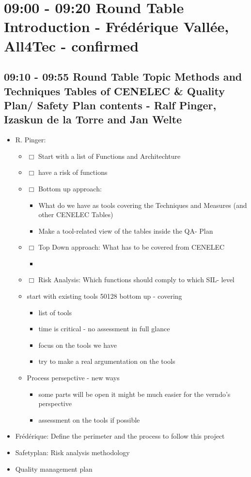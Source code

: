\documentclass[a4paper,german]{article}
\begin{document}
\setcounter{tocdepth}{3}
\tableofcontents
\vspace*{1cm}
\section{09:00 - 09:20 Round Table Introduction - Frédérique Vallée, All4Tec - confirmed}
\label{sec-1}
\subsection{09:10 - 09:55 Round Table Topic Methods and Techniques Tables of CENELEC \& Quality Plan/ Safety Plan  contents - Ralf Pinger, Izaskun de la Torre and Jan Welte}
\label{sec-1-1}

\begin{itemize}
\item R. Pinger:
\begin{itemize}
\item $\Box$ Start with a list of Functions and Architechture
\item $\Box$ have a risk of functions
\item $\Box$ Bottom up approach:
\begin{itemize}
\item What do we have as tools covering the Techniques and Measures (and other CENELEC Tables)
\item Make a tool-related view of the tables inside the QA- Plan
\end{itemize}
\item $\Box$ Top Down approach: What has to be covered from CENELEC
\begin{itemize}
\item 
\end{itemize}
\item $\Box$ Risk Analysis: Which functions should comply to which SIL- level
\item start with existing tools 50128 bottom up - covering
\begin{itemize}
\item list of tools
\item time is critical - no assessment in full glance
\item focus on the tools we have
\item try to make a real argumentation on the tools
\end{itemize}
\item Process persepctive - new ways
\begin{itemize}
\item some parts will be open it might be much easier for the verndo's perspective
\item assessment on the tools if possible
\end{itemize}
\end{itemize}
\item Frédérique: Define the perimeter and the process to follow this project
\item Safetyplan: Risk analysis methodology
\item Quality management plan
\end{itemize}
\end{document}
